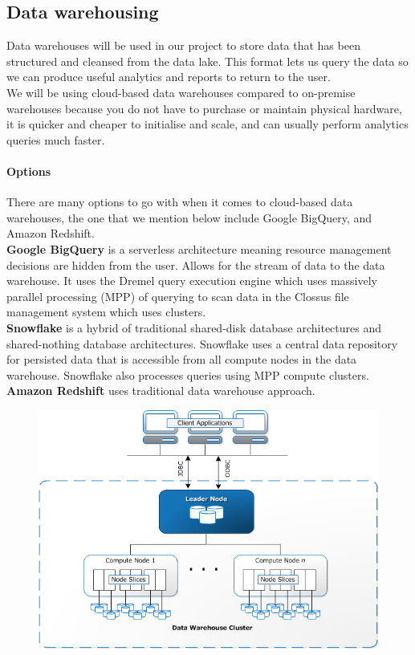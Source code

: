 \documentclass[10pt]{article}
\begin{document}
\newpage
\subsection{Data warehousing}
Data warehouses will be used in our project to store data that has been structured and cleansed from the data lake. This format lets us query the data so we can produce useful analytics and reports to return to the user.
\\
We will be using cloud-based data warehouses compared to on-premise warehouses because you do not have to purchase or maintain physical hardware, it is quicker and cheaper to initialise and scale, and can usually perform analytics queries much faster.
\paragraph{Options}There are many options to go with when it comes to cloud-based data warehouses, the one that we mention below include Google BigQuery, and Amazon Redshift.\cite{data-warehouse-comparisons}\\
\textbf{Google BigQuery} is a serverless architecture meaning resource management decisions are hidden from the user. Allows for the stream of data to the data warehouse. It uses the Dremel query execution engine which uses massively parallel processing (MPP) of querying to scan data in the Clossus file management system which uses clusters.\\
\textbf{Snowflake} is a hybrid of traditional shared-disk database architectures and shared-nothing database architectures. Snowflake uses a central data repository for persisted data that is accessible from all compute nodes in the data warehouse. Snowflake also processes queries using MPP compute clusters. \\
\textbf{Amazon Redshift}\cite{redshift-architecture} uses traditional data warehouse approach.\\
\begin{figure}[h!]
   	\centering
   	\includegraphics[width=0.7\linewidth]{images/Redshift-Architecture.png}	
   \end{figure}
\end{document}

